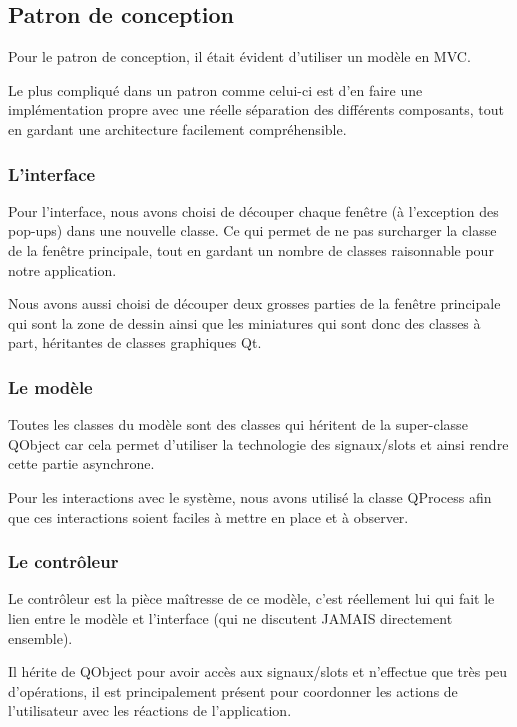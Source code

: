 \subsection{Patron de conception}

Pour le patron de conception, il était évident d'utiliser un modèle en MVC.

Le plus compliqué dans un patron comme celui-ci est d'en faire une implémentation propre avec une réelle séparation des différents composants, tout en gardant une architecture facilement compréhensible.

\subsubsection{L'interface}

Pour l'interface, nous avons choisi de découper chaque fenêtre (à l'exception des pop-ups) dans une nouvelle classe. Ce qui permet 
de ne pas surcharger la classe de la fenêtre principale, tout en gardant un nombre de classes raisonnable pour notre application.

Nous avons aussi choisi de découper deux grosses parties de la fenêtre principale qui sont la zone de dessin ainsi que les miniatures qui sont donc des classes à part, héritantes de classes graphiques Qt.

\subsubsection{Le modèle}

Toutes les classes du modèle sont des classes qui héritent de la super-classe QObject car cela permet d'utiliser la technologie des signaux/slots et ainsi rendre cette partie asynchrone.

Pour les interactions avec le système, nous avons utilisé la classe QProcess afin que ces interactions soient faciles à mettre en place et à observer.

\subsubsection{Le contrôleur}

Le contrôleur est la pièce maîtresse de ce modèle, c'est réellement lui qui fait le lien entre le modèle et l'interface (qui ne discutent JAMAIS directement ensemble).

Il hérite de QObject pour avoir accès aux signaux/slots et n'effectue que très peu d'opérations, il est principalement présent pour coordonner les actions de l'utilisateur avec les réactions de l'application.

